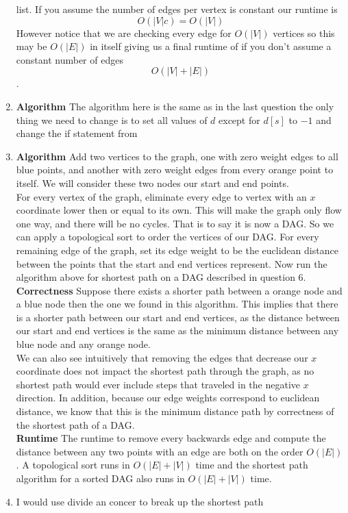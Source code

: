 \documentclass[11pt]{article}
\begin{document}
\begin{enumerate}
		list.
		If you assume the number of edges per vertex is constant our runtime is 
		$$O(|V|c) = O(|V|)$$
		However notice that we are checking every edge for $O(|V|)$
		vertices so this may be $O(|E|)$ in itself giving us a final
		runtime of if you don't assume a constant number of edges
		$$O(|V|+|E|)$$.
		\item
		\textbf{Algorithm}
		The algorithm here is the same as in the last question the only
		thing we need to change is to set all values of $d$ except for
		$d[s]$ to $-1$ and change the if statement from
		\item
		\textbf{Algorithm}
		Add two vertices to the graph, one with zero weight edges to all
		blue points, and another with zero weight edges from every orange
		point to itself. We will consider these two nodes our start and
		end points. \\
		For every vertex of the graph, eliminate every edge to vertex
		with an $x$ coordinate lower then or equal to its own. This will make the graph
		only flow one way, and there will be no cycles. That is to say it is
		now a DAG. So we can apply a topological sort to order the
		vertices of our DAG.
		For every remaining edge of the graph, set its edge weight to be the
		euclidean distance between the points that the start and end
		vertices represent. Now run the algorithm above for shortest
		path on a DAG described in question 6.
		\textbf{Correctness} 
		Suppose there exists a shorter path between a orange node and a
		blue node then the one we found in this algorithm. This implies
		that there is a shorter path between our start and end vertices,
		as the distance between our start and end vertices is the same
		as the minimum distance between any blue node and any orange
		node.\\
		We can also see intuitively that removing the edges that
		decrease our $x$ coordinate does not impact the shortest path
		through the graph, as no shortest path would ever include steps
		that traveled in the negative $x$ direction.
		In addition, because our edge weights correspond to euclidean
		distance, we know that this is the minimum distance path by
		correctness of the shortest path of a DAG.\\
		\textbf{Runtime}
		The runtime to remove every backwards edge and compute the
		distance between any two points with an edge are both on the
		order $O(|E|)$. A topological sort runs in $O(|E| + |V|)$ time
		and the shortest path algorithm for a sorted DAG also runs in
		$O(|E| + |V|)$ time.
		\item I would use divide an concer to break up the shortest path

\end{enumerate}
\end{document}
